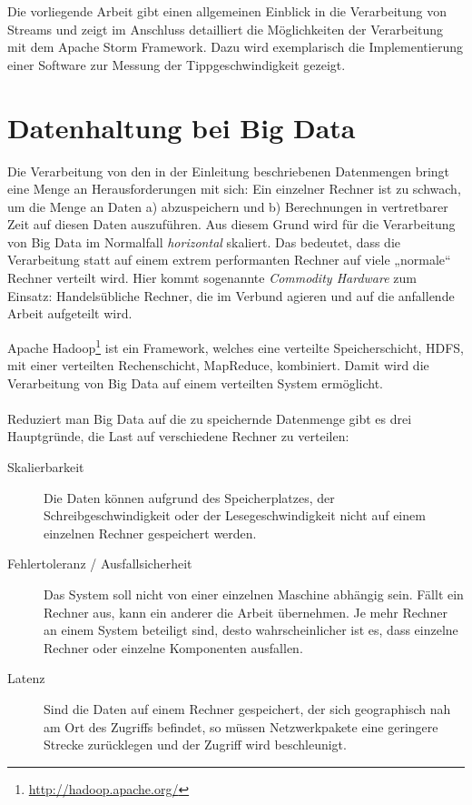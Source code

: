 \documentclass[a4paper,11pt]{scrartcl}
\begin{document}
  Die vorliegende Arbeit gibt einen allgemeinen Einblick in die Verarbeitung
  von Streams und zeigt im Anschluss detailliert die Möglichkeiten der
  Verarbeitung mit dem Apache Storm Framework. Dazu wird exemplarisch die
  Implementierung einer Software zur Messung der Tippgeschwindigkeit gezeigt.


  \section{Datenhaltung bei Big Data}
  Die Verarbeitung von den in der Einleitung beschriebenen Datenmengen bringt
  eine Menge an Herausforderungen mit sich: Ein einzelner Rechner ist zu
  schwach, um die Menge an Daten a) abzuspeichern und b) Berechnungen in
  vertretbarer Zeit auf diesen Daten auszuführen. Aus diesem Grund wird für die
  Verarbeitung von Big Data im Normalfall \textit{horizontal} skaliert. Das
  bedeutet, dass die Verarbeitung statt auf einem extrem performanten Rechner
  auf viele „normale“ Rechner verteilt wird.  Hier kommt sogenannte
  \textit{Commodity Hardware} zum Einsatz: Handelsübliche Rechner, die im
  Verbund agieren und auf die anfallende Arbeit aufgeteilt
  wird.\cite[S.~42]{white2010} 

  Apache Hadoop\footnote{\url{http://hadoop.apache.org/}} ist ein Framework,
  welches eine verteilte Speicherschicht, HDFS, mit einer verteilten
  Rechenschicht, MapReduce, kombiniert. Damit wird die Verarbeitung von Big
  Data auf einem verteilten System ermöglicht.
  
  \paragraph{}
  Reduziert man Big Data auf die zu speichernde Datenmenge gibt es drei
  Hauptgründe, die Last auf verschiedene Rechner zu
  verteilen:\cite[S.~145]{kleppmann17}

  \begin{description}
    \item[Skalierbarkeit] Die Daten können aufgrund des Speicherplatzes, der
      Schreibgeschwindigkeit oder der Lesegeschwindigkeit nicht auf einem
      einzelnen Rechner gespeichert werden.
    \item[Fehlertoleranz / Ausfallsicherheit] Das System soll nicht von einer
      einzelnen Maschine abhängig sein. Fällt ein Rechner aus, kann ein anderer
      die Arbeit übernehmen. Je mehr Rechner an einem System beteiligt sind,
      desto wahrscheinlicher ist es, dass einzelne Rechner oder einzelne
      Komponenten ausfallen.
    \item[Latenz] Sind die Daten auf einem Rechner gespeichert, der sich
      geographisch nah am Ort des Zugriffs befindet, so müssen Netzwerkpakete
      eine geringere Strecke zurücklegen und der Zugriff wird beschleunigt.
  \end{description}
\end{document}
